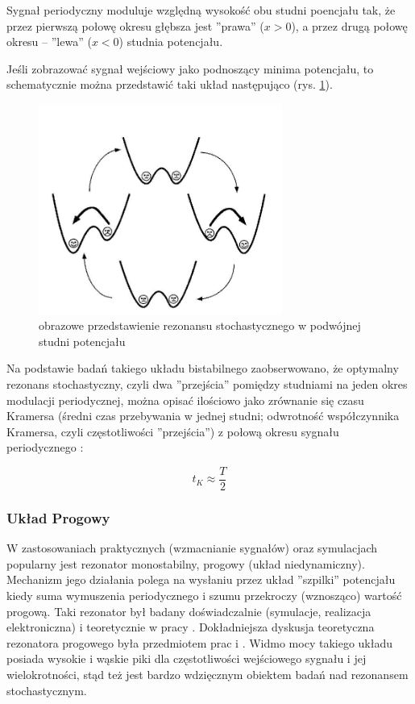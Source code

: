   Sygnał periodyczny moduluje względną wysokość obu studni poencjału tak, że przez pierwszą połowę okresu głębsza jest ''prawa'' ($x>0$), a przez drugą połowę okresu -- ''lewa'' ($x<0$) studnia potencjału.

  Jeśli zobrazować sygnał wejściowy jako podnoszący minima potencjału, to schematycznie można przedstawić taki układ następująco (rys. \ref{fig:graphics:double_well}).

  \begin{figure}
    \includegraphics[width=80mm]{images/sr.jpg}
    \caption{obrazowe przedstawienie rezonansu stochastycznego w podwójnej studni potencjału}
    \label{fig:graphics:double_well}
  \end{figure}

  Na podstawie badań takiego układu bistabilnego zaobserwowano, że optymalny rezonans stochastyczny, czyli dwa ''przejścia'' pomiędzy studniami na jeden okres modulacji periodycznej, można opisać ilościowo jako zrównanie się czasu Kramersa (średni czas przebywania w jednej studni; odwrotność współczynnika Kramersa, czyli częstotliwości ''przejścia'') z połową okresu sygnału periodycznego \cite{fauve}:

  \begin{equation} \label{sr:kramers}
    t_K \approx \frac{T}{2}
  \end{equation}  



  \subsubsection{Układ Progowy}
  \label{sec:uklad_progowy}

  W zastosowaniach praktycznych (wzmacnianie sygnałów) oraz symulacjach popularny jest rezonator monostabilny, progowy (układ niedynamiczny). Mechanizm jego działania polega na wysłaniu przez układ ''szpilki'' potencjału kiedy suma wymuszenia periodycznego i szumu przekroczy (wznosząco) wartość progową. Taki rezonator był badany doświadczalnie (symulacje, realizacja elektroniczna) i teoretycznie w pracy \cite{gingl_kiss_moss}. Dokładniejsza dyskusja teoretyczna rezonatora progowego była przedmiotem prac \cite{blondeau_e53} i \cite{blondeau_e55}. Widmo mocy takiego układu posiada wysokie i wąskie piki dla częstotliwości wejściowego sygnału i jej wielokrotności, stąd też jest bardzo wdzięcznym obiektem badań nad rezonansem stochastycznym.

